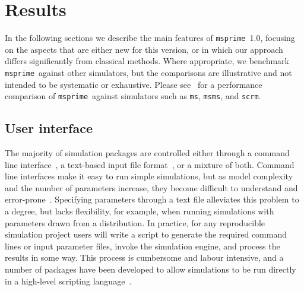 \documentclass{article}
\newcommand{\msprime}[0]{\texttt{msprime}}
\newcommand{\ms}[0]{\texttt{ms}}
\newcommand{\msms}[0]{\texttt{msms}}
\newcommand{\scrm}[0]{\texttt{scrm}}
\begin{document}

\section*{Results}
In the following sections we describe the main features of \msprime\ 1.0,
focusing on the aspects that are either new for this version, or in which
our approach differs significantly from classical methods. Where appropriate,
we benchmark \msprime\ against other simulators, but the comparisons are
illustrative and not intended to be systematic or exhaustive. Please
see~\cite{kelleher2016efficient} for a performance comparison of
\msprime\ against simulators such as \ms, \msms, and \scrm.


\subsection*{User interface}
\label{sec-sim-interface}

The majority of simulation packages are controlled either through
a command line interface~\citep[e.g.][]{hudson2002generating,kern2016discoal},
a text-based input file
format~\citep[e.g.][]{guillaume2006nemo,excoffier2011fastsimcoal,shlyakhter2014cosi2},
or a mixture of both.
Command line interfaces make it easy to run simple
simulations, but as model complexity and the number of parameters increase,
they become difficult to understand and
error-prone~\citep{ragsdale2020lessons,gower2021demes}.
Specifying parameters through a text file alleviates this problem to a degree,
but lacks flexibility, for example, when running simulations with parameters
drawn from a distribution. In practice, for any reproducible simulation
project users will write a script
to generate the required command lines or input parameter files,
invoke the simulation engine, and process the results in some way.
This process is cumbersome and labour intensive, and
a number of packages have been developed
to allow simulations to be run directly in a high-level
scripting language~\citep{staab2016coala,parobek2017skelesim,gladstein2018simprily}.
\end{document}
